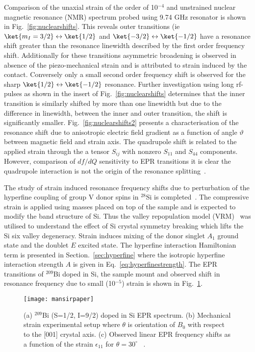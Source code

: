 Comparison of the unaxial strain of the order of 10$^{-4}$ and unstrained nuclear magnetic resonance (NMR) spectrum probed using 9.74 GHz resonator is shown in Fig.~\ref{fig:nuclearshifts}. This reveals outer transitions (ie $\ket{m_{I}=3/2} \leftrightarrow \ket{1/2}$ and $\ket{-3/2} \leftrightarrow \ket{-1/2}$ have a resonance shift greater than the resonance linewidth described by the first order frequency shift. Additionally for these transitions asymmetric broadening is observed in absence of the piezo-mechanical strain and is attributed to strain induced by the contact. Conversely only a small second order frequency shift is observed for the sharp $\ket{1/2} \leftrightarrow \ket{-1/2}$ resonance. Further investigation using long rf-pulses as shown in the insert of Fig.~\ref{fig:nuclearshifts} determines that the inner transition is similarly shifted by more than one linewidth but due to the difference in linewidth, between the inner and outer transition, the shift is significantly smaller. Fig.~\ref{fig:nuclearshifts2} presents a characterisation of the resonance shift due to anisotropic electric field gradient as a function of angle $\vartheta$ between magnetic field and strain axis. The quadrupole shift is related to the applied strain through the a tensor $S_{ij}$ with nonzero $S_{11}$ and $S_{44}$ components. However, comparison of $df/dQ$ sensitivity to EPR transitions it is clear the quadrupole interaction is not the origin of the resonance splitting~\citep{PhysRevApplied.9.044014}.

The study of strain induced resonance frequency shifts due to perturbation of the hyperfine coupling of group V donor spins in $^{28}$Si is completed~\citep{doi:10.1063/1.4919761}. The compressive strain is applied using masses placed on top of the sample and is expected to modify the band structure of Si. Thus the valley repopulation model (VRM)~\citep{PhysRev.124.1068} was utilised to understand the effect of Si crystal symmetry breaking which lifts the Si six valley degeneracy. Strain induces mixing of the donor singlet $A_{1}$ ground state and the doublet $E$ excited state. The hyperfine interaction Hamiltonian term is presented in Section.~\ref{sec:hyperfine} where the isotropic hyperfine interaction strength $A$ is given in Eq.~\ref{eq:hyperfinestrength}. The EPR transitions of $^{209}$Bi doped in Si, the sample mount and observed shift in resonance frequency due to small (10$^{-5}$) strain is shown in Fig.~\ref{fig:mansirpaper}. 

\begin{figure}[h]
\centering
\texttt{[image: mansirpaper]}
\caption{\label{fig:mansirpaper} (a) $^{209}$Bi (S=1/2, I=9/2) doped in Si EPR spectrum. (b) Mechanical strain experimental setup where $\theta$ is orientation of $B_{0}$ with respect to the [001] crystal axis. (c) Observed linear EPR frequency shifts as a function of the strain $\epsilon_{11}$ for $\theta = 30^{\circ}$ ~\citep{doi:10.1063/1.4919761}.}
\end{figure}

